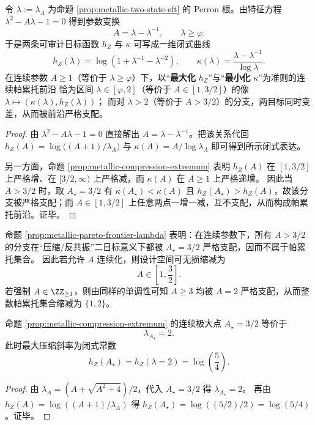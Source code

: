 \begin{proposition}\label{prop:metallic-pareto-frontier-lambda}
令 \(\lambda:=\lambda_A\) 为命题 \ref{prop:metallic-two-state-sft} 的 Perron 根。由特征方程
\(\lambda^2-A\lambda-1=0\) 得到参数变换
\[
A=\lambda-\lambda^{-1},\qquad \lambda\ge \varphi.
\]
于是两条可审计目标函数 \(h_Z\) 与 \(\kappa\) 可写成一维闭式曲线
\[
h_Z(\lambda)=\log\!\left(1+\lambda^{-1}-\lambda^{-2}\right),
\qquad
\kappa(\lambda)=\frac{\lambda-\lambda^{-1}}{\log\lambda}.
\]
在连续参数 \(A\ge 1\)（等价于 \(\lambda\ge\varphi\)）下，以“\textbf{最大化} \(h_Z\)”与“\textbf{最小化} \(\kappa\)”为准则的连续帕累托前沿
恰为区间 \(\lambda\in[\varphi,2]\)（等价于 \(A\in[1,3/2]\)）的像 \(\lambda\mapsto(\kappa(\lambda),h_Z(\lambda))\)；
而对 \(\lambda>2\)（等价于 \(A>3/2\)）的分支，两目标同时变差，从而被前沿严格支配。
\end{proposition}
\begin{proof}
由 \(\lambda^2-A\lambda-1=0\) 直接解出 \(A=\lambda-\lambda^{-1}\)。把该关系代回
\(
h_Z(A)=\log\bigl((A+1)/\lambda_A\bigr)
\)
与
\(
\kappa(A)=A/\log\lambda_A
\)
即可得到所示闭式表达。
\par
另一方面，命题 \ref{prop:metallic-compression-extremum} 表明 \(h_Z(A)\) 在 \([1,3/2]\) 上严格增、在 \([3/2,\infty)\) 上严格减，而 \(\kappa(A)\) 在 \(A\ge 1\) 上严格递增。
因此当 \(A>3/2\) 时，取 \(A_\star=3/2\) 有 \(\kappa(A_\star)<\kappa(A)\) 且 \(h_Z(A_\star)>h_Z(A)\)，故该分支被严格支配；而 \(A\in[1,3/2]\) 上任意两点一增一减，互不支配，从而构成帕累托前沿。证毕。
\end{proof}

\begin{remark}\label{rem:metallic-design-space-reduction}
命题 \ref{prop:metallic-pareto-frontier-lambda} 表明：在连续参数下，所有 \(A>3/2\) 的分支在“压缩/反共振”二目标意义下都被 \(A_\star=3/2\) 严格支配，因而不属于帕累托集合。
因此若允许 \(A\) 连续化，则设计空间可无损缩减为
\[
A\in\left[1,\frac{3}{2}\right].
\]
若强制 \(A\in\ZZ_{\ge 1}\)，则由同样的单调性可知 \(A\ge 3\) 均被 \(A=2\) 严格支配，从而整数帕累托集合缩减为 \(\{1,2\}\)。
\end{remark}

\begin{corollary}[最大投影压缩的“语法熵锁定”：\texorpdfstring{$\lambda=2$}{lambda=2}]\label{cor:metallic-compression-locking-lambda2}
命题 \ref{prop:metallic-compression-extremum} 的连续极大点 \(A_\star=3/2\) 等价于
\[
\lambda_{A_\star}=2.
\]
此时最大压缩斜率为闭式常数
\[
h_Z(A_\star)=h_Z(\lambda=2)=\log\!\left(\frac{5}{4}\right).
\]
\end{corollary}
\begin{proof}
由 \(\lambda_A=(A+\sqrt{A^2+4})/2\)，代入 \(A_\star=3/2\) 得 \(\lambda_{A_\star}=2\)。
再由 \(h_Z(A)=\log((A+1)/\lambda_A)\) 得
\(
h_Z(A_\star)=\log((5/2)/2)=\log(5/4)
\)。证毕。
\end{proof}

